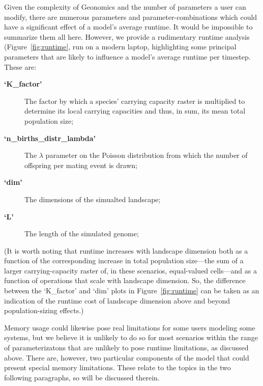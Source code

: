 ﻿\documentclass{article}
\begin{document}
Given the complexity of Geonomics and the number of parameters
a user can modify, there are numerous parameters and parameter-combinations
which could have a significant effect of a model's average runtime.
It would be impossible to summarize them all here.
However, we provide a rudimentary runtime analysis (Figure~\ref{fig:runtime},
run on a modern laptop, highlighting some principal parameters
that are likely to influence a model's average runtime per timestep.
These are:
\begin{description}
  \item [\textbf{`K\_factor'}] The factor by which a species' carrying capacity
        raster is multiplied to determine its local carrying capacities
        and thus, in sum, its mean total population size;
  \item [\textbf{`n\_births\_distr\_lambda'}] The $\lambda$ parameter on the Poisson
        distribution from which the number of offspring per mating event
        is drawn;
  \item [\textbf{`dim'}] The dimensions of the simualted landscape;
  \item [\textbf{`L'}] The length of the simulated genome;
\end{description}
(It is worth noting that runtime increases with landscape dimension both as a function
of the corresponding increase in total population size---the sum of a larger
carrying-capacity raster of, in these scenarios, equal-valued cells---and as
a function of operations that scale with landscape dimension.
So, the difference between the `K\_factor' and `dim' plots in Figure~\ref{fig:runtime}
can be taken as an indication of the runtime cost of landscape dimension
above and beyond population-sizing effects.)

Memory usage could likewise pose real limitations for some users modeling some systems,
but we believe it is unlikely to do so for most scenarios within the range
of parameterizatons that are unlikely to pose runtime limitations, as discussed above.
There are, however, two particular components of the model that could present
special memory limitations.
These relate to the topics in the two following paragraphs,
so will be discussed therein.
\end{document}
